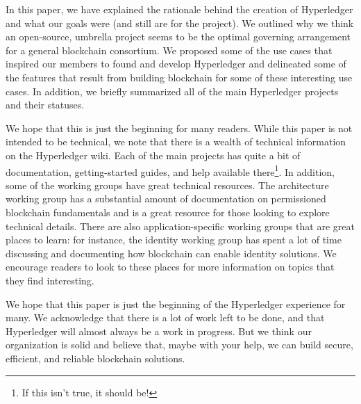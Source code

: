 In this paper, we have explained the rationale behind the creation of Hyperledger and what our goals were (and still are for the project).  We outlined why we think an open-source, umbrella project seems to be the optimal governing arrangement for a general blockchain consortium.  We proposed some of the use cases that inspired our members to found and develop Hyperledger and delineated some of the features that result from building blockchain for some of these interesting use cases.  In addition, we briefly summarized all of the main Hyperledger projects and their statuses.

We hope that this is just the beginning for many readers.  While this paper is not intended to be technical, we note that there is a wealth of technical information on the Hyperledger wiki.  Each of the main projects has quite a bit of documentation, getting-started guides, and help available there\footnote{If this isn't true, it should be!}.  In addition, some of the working groups have great technical resources.  The architecture working group has a substantial amount of documentation on permissioned blockchain fundamentals and is a great resource for those looking to explore technical details.  There are also application-specific working groups that are great places to learn: for instance, the identity working group has spent a lot of time discussing and documenting how blockchain can enable identity solutions.  We encourage readers to look to these places for more information on topics that they find interesting.

We hope that this paper is just the beginning of the Hyperledger experience for many.  We acknowledge that there is a lot of work left to be done, and that Hyperledger will almost always be a work in progress.  But we think our organization is solid and believe that, maybe with your help, we can build secure, efficient, and reliable blockchain solutions.
